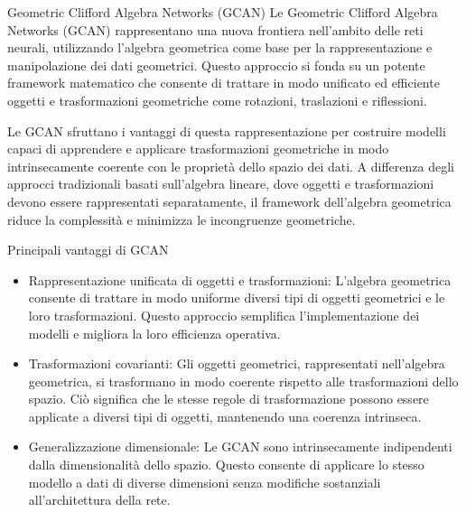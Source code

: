 \begin{frame}{Geometric Clifford Algebra Networks (GCAN)}
   Le Geometric Clifford Algebra Networks (GCAN) rappresentano una nuova frontiera nell’ambito delle reti neurali, utilizzando l’algebra geometrica come base per la rappresentazione e manipolazione dei dati geometrici. 
   Questo approccio si fonda su un potente framework matematico che consente di trattare in modo unificato ed efficiente oggetti e trasformazioni geometriche come rotazioni, traslazioni e riflessioni.
\end{frame}

\begin{frame}
    Le GCAN sfruttano i vantaggi di questa rappresentazione per costruire modelli capaci di apprendere e applicare trasformazioni geometriche in modo intrinsecamente coerente con le proprietà dello spazio dei dati. 
   A differenza degli approcci tradizionali basati sull’algebra lineare, dove oggetti e trasformazioni devono essere rappresentati separatamente, il framework dell’algebra geometrica riduce la complessità e minimizza le incongruenze geometriche.
\end{frame}

\begin{frame}{Principali vantaggi di GCAN}
   \begin{itemize}
      \item Rappresentazione unificata di oggetti e trasformazioni: 
      L’algebra geometrica consente di trattare in modo uniforme diversi tipi di oggetti geometrici e le loro trasformazioni. Questo approccio semplifica l’implementazione dei modelli e migliora la loro efficienza operativa.
      
      \item Trasformazioni covarianti: 
      Gli oggetti geometrici, rappresentati nell’algebra geometrica, si trasformano in modo coerente rispetto alle trasformazioni dello spazio. Ciò significa che le stesse regole di trasformazione possono essere applicate a diversi tipi di oggetti, mantenendo una coerenza intrinseca.
   \end{itemize}
\end{frame}

\begin{frame}
   \begin{itemize}
      \item Generalizzazione dimensionale: 
      Le GCAN sono intrinsecamente indipendenti dalla dimensionalità dello spazio. Questo consente di applicare lo stesso modello a dati di diverse dimensioni senza modifiche sostanziali all’architettura della rete.
   \end{itemize}
\end{frame}

